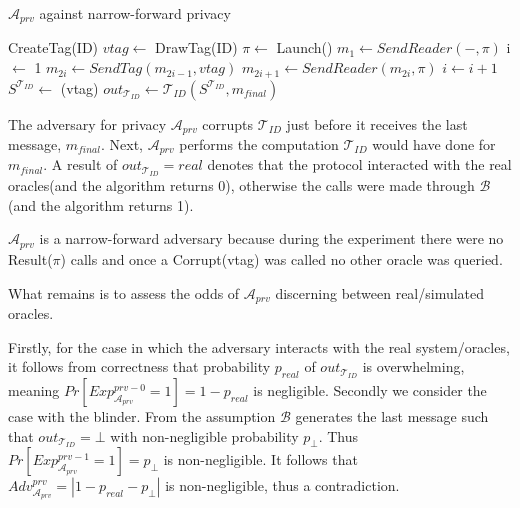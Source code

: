     \begin{algorithm}[H] %
        \centering
        \caption{$\mathcal{A}_{prv}$ against narrow-forward privacy}
        \begin{algorithmic}[1] %
            \State CreateTag(ID)
            \State $vtag \leftarrow$ DrawTag(ID)
            \State $\pi \leftarrow$ Launch() 
            \State $m_1 \leftarrow SendReader(-,\pi)$ 
            \State i $\leftarrow$ 1
                \State $m_{2i} \gets SendTag(m_{2i-1}, vtag)$ 
                \State $m_{2i+1} \gets SendReader(m_{2i}, \pi)$
                \State $i \gets i+1$
            \EndWhile
            \State $S^{\mathcal{T}_{ID}} \gets$ (vtag)
            \State $out_{\mathcal{T}_{ID}} \gets \mathcal{T}_{ID}(S^{\mathcal{T}_{ID}}, m_{final})$
                \State {}
            \Else
                \State {}
            \EndIf
        \end{algorithmic}
    \end{algorithm}

    The adversary for privacy $\mathcal{A}_{prv}$ corrupts $\mathcal{T}_{ID}$ just before it receives the last message, $m_{final}$. Next, $\mathcal{A}_{prv}$
    performs the computation $\mathcal{T}_{ID}$ would have done for $m_{final}$. A result of $out_{\mathcal{T}_{ID}} = real$ denotes that the protocol interacted
    with the real oracles(and the algorithm returns 0), otherwise the calls were made through $\mathcal{B}$(and the algorithm returns 1).

    $\mathcal{A}_{prv}$ is a narrow-forward adversary because during the experiment there were no Result($\pi$) calls and once a Corrupt(vtag) was called 
    no other oracle was queried.

    What remains is to assess the odds of $\mathcal{A}_{prv}$ discerning between real/simulated oracles.

    Firstly, for the case in which the adversary interacts with the real system/oracles, it follows from correctness that probability $p_{real}$ of 
    $out_{\mathcal{T}_{ID}}$ is overwhelming, meaning $Pr[Exp_{\mathcal{A}_{prv}}^{prv-0} = 1] = 1-p_{real}$ is negligible. Secondly we consider the case
    with the blinder. From the assumption $\mathcal{B}$ generates the last message such that $out_{\mathcal{T}_{ID}} = \bot$ with non-negligible probability $p_{\bot}$.
    Thus $Pr[Exp_{\mathcal{A}_{prv}}^{prv-1} = 1] = p_{\bot}$ is non-negligible. It follows that $Adv_{\mathcal{A}_{prv}}^{prv} = |1-p_{real}-p_{\bot}|$ is non-negligible,
    thus a contradiction. 

